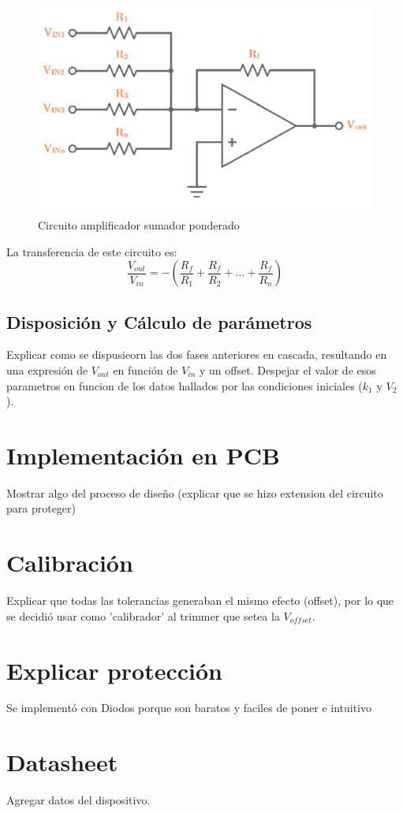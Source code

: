 \begin{figure}[ht]
\centering
\includegraphics[scale=0.3]{../parte6/Informe_Latex/reources/adder_opamp_diagram.png}
\caption{Circuito amplificador sumador ponderado}
\label{6_adder_opamp_fig}
\end{figure}

La transferencia de este circuito es:
\[\frac{V_{out}}{V_{in}} = - \left(\frac{R_f}{R_1} + \frac{R_f}{R_2} + ... + \frac{R_f}{R_n} \right)\]

\subsection{Disposición y Cálculo de parámetros}
Explicar como se dispusieorn las dos fases anteriores en cascada, resultando en una expresión de $V_{out}$ en función de $V_{in}$ y un offset.
Despejar el valor de esos parametros en funcion de los datos hallados por las condiciones iniciales ($k_1$ y $V_2$).

\section{Implementación en PCB}
Mostrar algo del proceso de diseño (explicar que se hizo extension del circuito para proteger)

\section{Calibración}
Explicar que todas las tolerancias generaban el mismo efecto (offset), por lo que se decidió usar como 'calibrador' al trimmer que setea la $V_{offset}$.

\section{Explicar protección}
Se implementó con Diodos porque son baratos y faciles de poner e intuitivo

\section{Datasheet}
Agregar datos del dispositivo.
